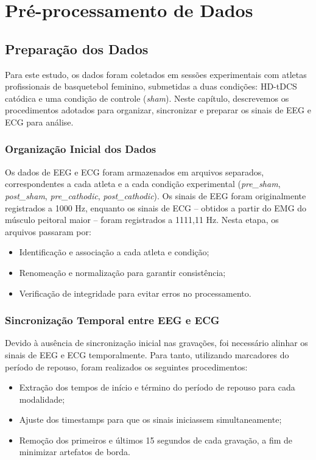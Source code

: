 \chapter{Pré-processamento de Dados}
\label{chap:preprocessamento_de_dados}
\section{Preparação dos Dados}
Para este estudo, os dados foram coletados em sessões experimentais com atletas profissionais de basquetebol feminino, submetidas a duas condições: HD-tDCS catódica e uma condição de controle (\textit{sham}). Neste capítulo, descrevemos os procedimentos adotados para organizar, sincronizar e preparar os sinais de EEG e ECG para análise.

\subsection{Organização Inicial dos Dados}
Os dados de EEG e ECG foram armazenados em arquivos separados, correspondentes a cada atleta e a cada condição experimental (\textit{pre\_sham}, \textit{post\_sham}, \textit{pre\_cathodic}, \textit{post\_cathodic}). Os sinais de EEG foram originalmente registrados a 1000 Hz, enquanto os sinais de ECG – obtidos a partir do EMG do músculo peitoral maior – foram registrados a 1111,11 Hz. Nesta etapa, os arquivos passaram por:
\begin{itemize}
    \item Identificação e associação a cada atleta e condição;
    \item Renomeação e normalização para garantir consistência;
    \item Verificação de integridade para evitar erros no processamento.
\end{itemize}

\subsection{Sincronização Temporal entre EEG e ECG}
Devido à ausência de sincronização inicial nas gravações, foi necessário alinhar os sinais de EEG e ECG temporalmente. Para tanto, utilizando marcadores do período de repouso, foram realizados os seguintes procedimentos:

\begin{itemize}
    \item Extração dos tempos de início e término do período de repouso para cada modalidade;
    \item Ajuste dos timestamps para que os sinais iniciassem simultaneamente;
    \item Remoção dos primeiros e últimos 15 segundos de cada gravação, a fim de minimizar artefatos de borda.
\end{itemize}

